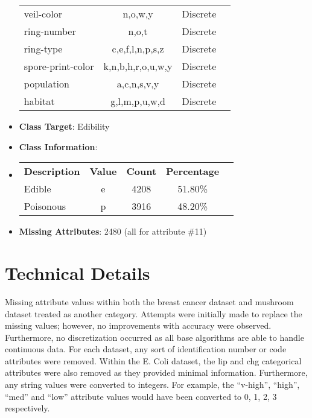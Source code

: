 \documentclass[11pt]{article}
\newcommand{\bb}{\textbf}
\begin{document}
\begin{itemize}[leftmargin=*]
\begin{tabular}{l c c c }
    veil-color               & n,o,w,y                 & Discrete  \\
    ring-number              & n,o,t                   & Discrete  \\
    ring-type                & c,e,f,l,n,p,s,z         & Discrete  \\
    spore-print-color        & k,n,b,h,r,o,u,w,y       & Discrete  \\
    population               & a,c,n,s,v,y             & Discrete  \\
    habitat                  & g,l,m,p,u,w,d           & Discrete
  \end{tabular}
  \item[] \bb{Class Target}: Edibility
  \item[] \bb{Class Information}:
  \item[]
  \begin{tabular}{l c c c c }
    \bb{Description} & \bb{Value} & \bb{Count} & \bb{Percentage} \\
    Edible           & e          & 4208       & 51.80\%        \\
    Poisonous        & p          & 3916       & 48.20\%
  \end{tabular}
  \item[] \bb{Missing Attributes}: 2480 (all for attribute \#11)
\end{itemize}

\section{Technical Details} \label{sec:details}
Missing attribute values within both the breast cancer dataset and mushroom dataset treated as another category. Attempts were initially made to replace the missing values; however, no improvements with accuracy were observed. Furthermore, no discretization occurred as all base algorithms are able to handle continuous data. For each dataset, any sort of identification number or code attributes were removed. Within the E. Coli dataset, the lip and chg categorical attributes were also removed as they provided minimal information. Furthermore, any string values were converted to integers. For example, the ``v-high'', ``high'', ``med'' and ``low'' attribute values would have been converted to 0, 1, 2, 3 respectively.
\end{document}
